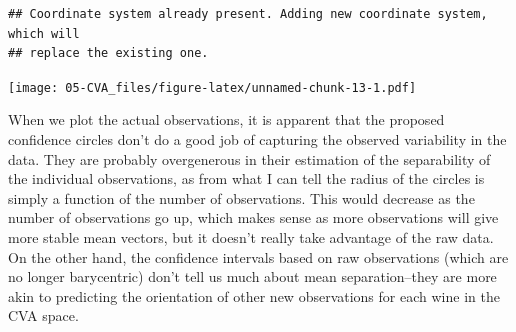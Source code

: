 \documentclass[
]{book}
\newenvironment{Shaded}{\begin{snugshade}}{\end{snugshade}}
\newcommand{\AttributeTok}[1]{\textcolor[rgb]{0.13,0.29,0.53}{#1}}
\newcommand{\DecValTok}[1]{\textcolor[rgb]{0.00,0.00,0.81}{#1}}
\newcommand{\FloatTok}[1]{\textcolor[rgb]{0.00,0.00,0.81}{#1}}
\newcommand{\FunctionTok}[1]{\textcolor[rgb]{0.13,0.29,0.53}{\textbf{#1}}}
\newcommand{\NormalTok}[1]{#1}
\newcommand{\SpecialCharTok}[1]{\textcolor[rgb]{0.81,0.36,0.00}{\textbf{#1}}}
\newcommand{\StringTok}[1]{\textcolor[rgb]{0.31,0.60,0.02}{#1}}
\begin{document}
\begin{Shaded}
\end{Shaded}

\begin{verbatim}
## Coordinate system already present. Adding new coordinate system, which will
## replace the existing one.
\end{verbatim}

\texttt{[image: 05-CVA\_files/figure-latex/unnamed-chunk-13-1.pdf]}

When we plot the actual observations, it is apparent that the proposed confidence circles don't do a good job of capturing the observed variability in the data. They are probably overgenerous in their estimation of the separability of the individual observations, as from what I can tell the radius of the circles is simply a function of the number of observations. This would decrease as the number of observations go up, which makes sense as more observations will give more stable mean vectors, but it doesn't really take advantage of the raw data. On the other hand, the confidence intervals based on raw observations (which are no longer barycentric) don't tell us much about mean separation--they are more akin to predicting the orientation of other new observations for each wine in the CVA space.
\end{document}
